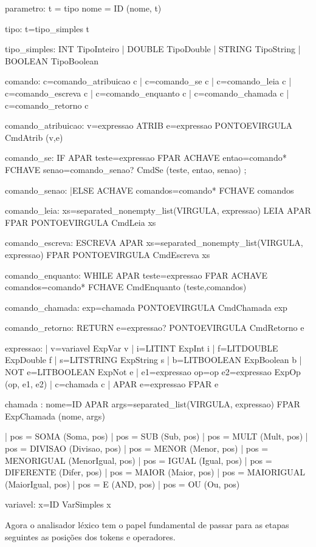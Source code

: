 \documentclass[12pt,a4paper,twoside]{report}
\begin{document}
\begin{terminal}
parametro: t = tipo nome = ID  { (nome, t) }


tipo: t=tipo_simples  { t }

tipo_simples: INT       { TipoInteiro   }
	    | DOUBLE      { TipoDouble }
            | STRING { TipoString }
            | BOOLEAN    { TipoBoolean }

comando: c=comando_atribuicao { c }
       | c=comando_se         { c }
       | c=comando_leia       { c }
       | c=comando_escreva    { c }
       | c=comando_enquanto   { c }
       | c=comando_chamada    { c }
       | c=comando_retorno    { c }


comando_atribuicao: v=expressao ATRIB e=expressao PONTOEVIRGULA {
      CmdAtrib (v,e)
}

comando_se: IF APAR teste=expressao FPAR ACHAVE
               entao=comando*  FCHAVE
               senao=comando_senao?
            { CmdSe (teste, entao, senao) };

comando_senao:
|ELSE ACHAVE comandos=comando* FCHAVE {comandos}

comando_leia: xs=separated_nonempty_list(VIRGULA, expressao)  LEIA APAR   FPAR PONTOEVIRGULA {
                   CmdLeia xs
               }

comando_escreva: ESCREVA APAR xs=separated_nonempty_list(VIRGULA, expressao) FPAR PONTOEVIRGULA {
                 CmdEscreva xs
             }

comando_enquanto: WHILE APAR teste=expressao FPAR ACHAVE
			comandos=comando*
		  FCHAVE { CmdEnquanto (teste,comandos) }


comando_chamada: exp=chamada PONTOEVIRGULA { CmdChamada exp }

comando_retorno: RETURN e=expressao? PONTOEVIRGULA { CmdRetorno e}


expressao:
         | v=variavel     { ExpVar v    }
         | i=LITINT       { ExpInt i    }
	 | f=LITDOUBLE      { ExpDouble f   }
         | s=LITSTRING { ExpString s }
         | b=LITBOOLEAN    { ExpBoolean b }
         | NOT e=LITBOOLEAN {ExpNot e}
	 | e1=expressao op=op e2=expressao { ExpOp (op, e1, e2) }
         | c=chamada      { c }
 	 | APAR e=expressao FPAR { e }

chamada : nome=ID APAR args=separated_list(VIRGULA, expressao) FPAR {
             ExpChamada  (nome, args)}

	| pos = SOMA       { (Soma, pos)       }
        | pos = SUB      { (Sub, pos)      }
        | pos = MULT       { (Mult, pos)       }
        | pos = DIVISAO        { (Divisao, pos)        }
        | pos = MENOR      { (Menor, pos)      }
	| pos = MENORIGUAL { (MenorIgual, pos) }
        | pos = IGUAL      { (Igual, pos)      }
        | pos = DIFERENTE      { (Difer, pos)      }
        | pos = MAIOR      { (Maior, pos)      }
	| pos = MAIORIGUAL { (MaiorIgual, pos) }
        | pos = E          { (AND, pos)        }
        | pos = OU         { (Ou, pos)         }


variavel: x=ID       { VarSimples x }

\end{terminal}
Agora o analisador léxico tem o papel fundamental de passar para as etapas seguintes as posições dos tokens e operadores.  
\end{document}
